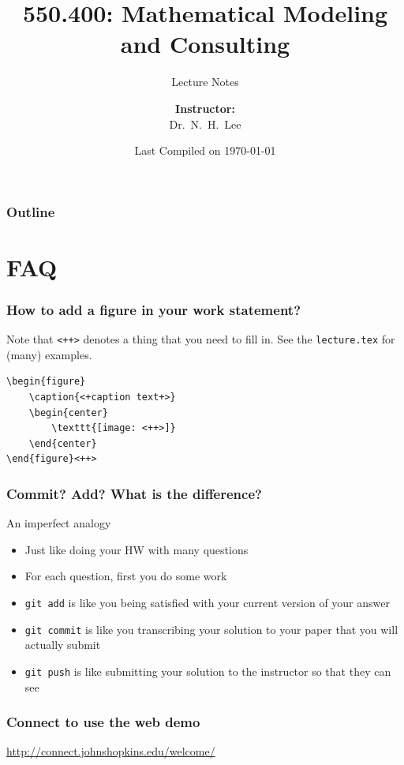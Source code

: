 \documentclass[hyperref={colorlinks=false},handout,10pt]{beamer}
\title{{\color{blue} \LARGE 550.400: Mathematical Modeling and Consulting\newline} }
\subtitle{{\color{red} \large Lecture Notes} }
\author{ 
    {\bf{Instructor:}} \\ 
Dr.~N.~H.~Lee \\ 
    \vspace{5pt}
}
\institute{JHU AMS 2012 FALL}
\date{\mygreen Last Compiled on \today}
\let\olditem\item
\renewcommand{\item}{\setlength{\itemsep}{0.5\baselineskip}\olditem}
\begin{document}
\begin{frame}[plain]
  \titlepage
\end{frame}

\begin{frame}[shrink]
  \frametitle{Outline}
  \tableofcontents
\end{frame}

\section{FAQ} 

\begin{frame}[fragile]
    \frametitle{How to add a figure in your work statement?}
        Note that \verb$<++>$ denotes a thing that you need to fill in.
        See the \texttt{lecture.tex} for (many) examples.
        \vskip0.1in
    \begin{lstlisting}
\begin{figure}
    \caption{<+caption text+>}
    \begin{center}
        \texttt{[image: <++>]}
    \end{center}
\end{figure}<++>
    \end{lstlisting}
\end{frame}

\begin{frame}
    \frametitle{Commit? Add? What is the difference?}
    \begin{block}{An imperfect analogy}
        \begin{itemize}
            \item Just like doing your HW with many questions
            \item For each question, first you do some work
            \item \texttt{git add} is like you being satisfied with your current
                version of your answer
            \item \texttt{git commit} is like you transcribing your solution to your
                paper that you will actually submit
            \item \texttt{git push} is like submitting your solution to the
                instructor so that they can see
        \end{itemize}
    \end{block}
\end{frame}

\begin{frame}
    \frametitle{Connect to use the web demo}
    \begin{center}
        \Large
        \href{http://connect.johnshopkins.edu/welcome/}{http://connect.johnshopkins.edu/welcome/}
\end{center}
\end{frame}
\end{document}
